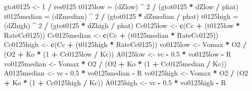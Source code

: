 \documentclass[
]{krantz}
\makeatletter
\newenvironment{Shaded}{\begin{snugshade}}{\end{snugshade}}
\newcommand{\DecValTok}[1]{\textcolor[rgb]{0.00,0.00,0.81}{#1}}
\newcommand{\FloatTok}[1]{\textcolor[rgb]{0.00,0.00,0.81}{#1}}
\newcommand{\KeywordTok}[1]{\textcolor[rgb]{0.13,0.29,0.53}{\textbf{#1}}}
\newcommand{\NormalTok}[1]{#1}
\newcommand{\OperatorTok}[1]{\textcolor[rgb]{0.81,0.36,0.00}{\textbf{#1}}}
\newcommand{\StringTok}[1]{\textcolor[rgb]{0.31,0.60,0.02}{#1}}
\newenvironment{kframe}{%
\medskip{}
\setlength{\fboxsep}{.8em}
 \def\at@end@of@kframe{}%
 \ifinner\ifhmode%
  \def\at@end@of@kframe{\end{minipage}}%
  \begin{minipage}{\columnwidth}%
 \fi\fi%
 \def\FrameCommand##1{\hskip\@totalleftmargin \hskip-\fboxsep
 \colorbox{shadecolor}{##1}\hskip-\fboxsep
     \hskip-\linewidth \hskip-\@totalleftmargin \hskip\columnwidth}%
 \MakeFramed {\advance\hsize-\width
   \@totalleftmargin\z@ \linewidth\hsize
   \@setminipage}}%
 {\par\unskip\endMakeFramed%
 \at@end@of@kframe}
\renewenvironment{Shaded}{\begin{kframe}}{\end{kframe}}
\makeatother
\begin{document}
\begin{Shaded}
\begin{Highlighting}[]
\NormalTok{gtot0125 <-}\StringTok{ }\DecValTok{1} \OperatorTok{/}\StringTok{ }\NormalTok{res0125}
\NormalTok{t0125low =}\StringTok{ }\NormalTok{(dZlow) }\OperatorTok{^}\StringTok{ }\DecValTok{2} \OperatorTok{/}\StringTok{ }\NormalTok{(gtot0125 }\OperatorTok{*}\StringTok{ }\NormalTok{dZlow }\OperatorTok{/}\StringTok{ }\NormalTok{phat)}
\NormalTok{t0125median =}\StringTok{ }\NormalTok{(dZmedian) }\OperatorTok{^}\StringTok{ }\DecValTok{2} \OperatorTok{/}\StringTok{ }\NormalTok{(gtot0125 }\OperatorTok{*}\StringTok{ }\NormalTok{dZmedian }\OperatorTok{/}\StringTok{ }\NormalTok{phat)}
\NormalTok{t0125high =}\StringTok{ }\NormalTok{(dZhigh) }\OperatorTok{^}\StringTok{ }\DecValTok{2} \OperatorTok{/}\StringTok{ }\NormalTok{(gtot0125 }\OperatorTok{*}\StringTok{ }\NormalTok{dZhigh }\OperatorTok{/}\StringTok{ }\NormalTok{phat)}
\NormalTok{Cc0125low <-}\StringTok{ }\KeywordTok{c}\NormalTok{(Cc }\OperatorTok{+}\StringTok{ }\NormalTok{(t0125low }\OperatorTok{*}\StringTok{ }\NormalTok{RateCc0125))}
\NormalTok{Cc0125median <-}\StringTok{ }\KeywordTok{c}\NormalTok{(Cc }\OperatorTok{+}\StringTok{ }\NormalTok{(t0125median }\OperatorTok{*}\StringTok{ }\NormalTok{RateCc0125))}
\NormalTok{Cc0125high <-}\StringTok{ }\KeywordTok{c}\NormalTok{(Cc }\OperatorTok{+}\StringTok{ }\NormalTok{(t0125high }\OperatorTok{*}\StringTok{ }\NormalTok{RateCc0125))}
\NormalTok{vo0125low <-}\StringTok{ }\NormalTok{Vomax }\OperatorTok{*}\StringTok{ }\NormalTok{O2 }\OperatorTok{/}\StringTok{ }\NormalTok{(O2 }\OperatorTok{+}\StringTok{ }\NormalTok{Ko }\OperatorTok{*}\StringTok{ }\NormalTok{(}\DecValTok{1} \OperatorTok{+}\StringTok{ }\NormalTok{Cc0125low }\OperatorTok{/}\StringTok{ }\NormalTok{Kc)) }
\NormalTok{A0125low <-}\StringTok{ }\NormalTok{vc }\OperatorTok{-}\StringTok{ }\FloatTok{0.5} \OperatorTok{*}\StringTok{ }\NormalTok{vo0125low }\OperatorTok{-}\StringTok{ }\NormalTok{R }
\NormalTok{vo0125median <-}\StringTok{ }\NormalTok{Vomax }\OperatorTok{*}\StringTok{ }\NormalTok{O2 }\OperatorTok{/}\StringTok{ }\NormalTok{(O2 }\OperatorTok{+}\StringTok{ }\NormalTok{Ko }\OperatorTok{*}\StringTok{ }\NormalTok{(}\DecValTok{1} \OperatorTok{+}\StringTok{ }\NormalTok{Cc0125median }\OperatorTok{/}\StringTok{ }\NormalTok{Kc)) }
\NormalTok{A0125median <-}\StringTok{ }\NormalTok{vc }\OperatorTok{-}\StringTok{ }\FloatTok{0.5} \OperatorTok{*}\StringTok{ }\NormalTok{vo0125median }\OperatorTok{-}\StringTok{ }\NormalTok{R }
\NormalTok{vo0125high <-}\StringTok{ }\NormalTok{Vomax }\OperatorTok{*}\StringTok{ }\NormalTok{O2 }\OperatorTok{/}\StringTok{ }\NormalTok{(O2 }\OperatorTok{+}\StringTok{ }\NormalTok{Ko }\OperatorTok{*}\StringTok{ }\NormalTok{(}\DecValTok{1} \OperatorTok{+}\StringTok{ }\NormalTok{Cc0125high }\OperatorTok{/}\StringTok{ }\NormalTok{Kc)) }
\NormalTok{A0125high <-}\StringTok{ }\NormalTok{vc }\OperatorTok{-}\StringTok{ }\FloatTok{0.5} \OperatorTok{*}\StringTok{ }\NormalTok{vo0125high }\OperatorTok{-}\StringTok{ }\NormalTok{R }


\end{Highlighting}
\end{Shaded}
\end{document}
